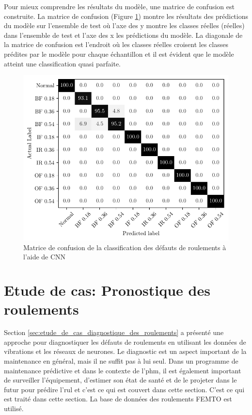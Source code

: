 Pour mieux comprendre les résultats du modèle, une matrice de confusion est construite. La matrice de confusion (Figure \ref{fig:bearings_faults_classification_confusion_matrix}) montre les résultats des prédictions du modèle sur l'ensemble de test où l'axe des y montre les classes réelles (réelles) dans l'ensemble de test et l'axe des x les prédictions du modèle. La diagonale de la matrice de confusion est l'endroit où les classes réelles croisent les classes prédites par le modèle pour chaque échantillon et il est évident que le modèle atteint une classification quasi parfaite.

\begin{figure}[H]
    \centering
    \includegraphics{figures/cw_bearings_faults_classification.pdf}
    \caption{Matrice de confusion de la classification des défauts de roulements à l'aide de CNN}
    \label{fig:bearings_faults_classification_confusion_matrix}
\end{figure}

\section{Etude de cas: Pronostique des roulements}%
\label{sec:etude_de_cas_pronostique_des_roulements}
Section \ref{sec:etude_de_cas_diagnostique_des_roulements} a présenté une approche pour diagnostiquer les défauts de roulements en utilisant les données de vibrations et les réseaux de neurones. Le diagnostic est un aspect important de la maintenance en général, mais il ne suffit pas à lui seul. Dans un programme de maintenance prédictive et dans le contexte de l'\acrshort{phm}, il est également important de surveiller l'équipement, d'estimer son état de santé et de le projeter dans le futur pour prédire l'\acrshort{rul} et c'est ce qui est couvert dans cette section. C'est ce qui est traité dans cette section. La base de données des roulements FEMTO est utilisé.


